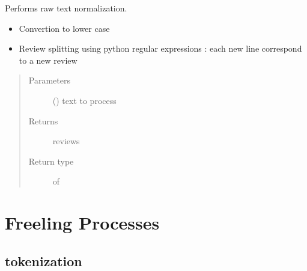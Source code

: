 \documentclass[letterpaper,10pt,english]{sphinxmanual}
\begin{document}
\begin{fulllineitems}
\label{\detokenize{index:loacore.process.review_process.normalize}}
Performs raw text normalization.
\begin{itemize}
\item {} 
Convertion to lower case

\item {} 
Review splitting using python regular expressions : each new line correspond to a new review

\end{itemize}
\begin{quote}\begin{description}
\item[{Parameters}] \leavevmode
{} () \textendash{} text to process

\item[{Returns}] \leavevmode
reviews

\item[{Return type}] \leavevmode
{} of 

\end{description}\end{quote}

\end{fulllineitems}



\section{Freeling Processes}
\label{\detokenize{index:freeling-processes}}

\subsection{tokenization}
\label{\detokenize{index:module-loacore.process.sentence_process}}\label{\detokenize{index:tokenization}}
\end{document}
